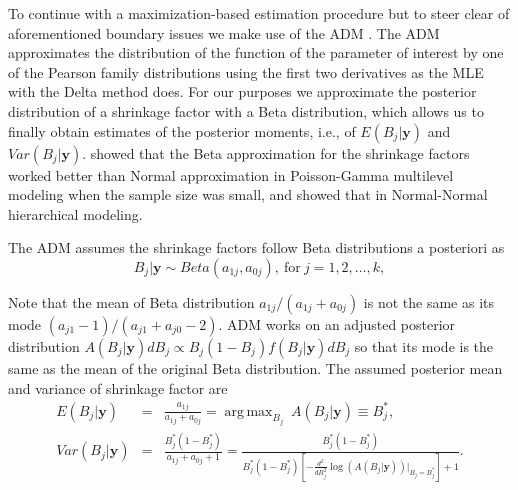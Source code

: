 \documentclass[article]{jss}
\DeclareMathOperator*{\argmax}{arg\,max}
\begin{document}
To continue with a maximization-based estimation procedure but to steer clear of aforementioned boundary issues we make use of the ADM \citep{carl1988, morris1997, tang2011}. The ADM approximates the distribution of the function of the parameter of interest by one of the Pearson family distributions using the first two derivatives as the MLE with the Delta method does. For our purposes we approximate the posterior distribution of a shrinkage factor with a Beta distribution, which allows us to finally obtain estimates of the posterior moments, i.e.,  of $E(B_{j}\vert\boldsymbol{y})$ and $Var(B_{j}\vert\boldsymbol{y})$.  \citet{morris1997} showed that the Beta approximation for the shrinkage factors worked better than Normal approximation in Poisson-Gamma multilevel modeling when the sample size was small, and \citet{tang2011} showed that  in Normal-Normal hierarchical modeling. 

The ADM assumes the shrinkage factors follow Beta distributions a posteriori as
\begin{equation}\label{admshrinkage}
B_j\vert\boldsymbol{y}\sim Beta(a_{1j}, a_{0j}), ~\textrm{for}~j=1, 2, \ldots, k,
\end{equation}


Note that the mean of Beta distribution $a_{1j}/(a_{1j}+a_{0j})$ is not the same as its mode $(a_{j1}-1)/(a_{j1}+a_{j0}-2)$. ADM works on an adjusted posterior distribution $A(B_j\vert \boldsymbol{y})dB_j\propto B_j(1-B_j)f(B_j\vert \boldsymbol{y})dB_j$ so that its mode is the same as the mean of the original Beta distribution. The assumed posterior mean and variance of shrinkage factor are
\begin{eqnarray}
E(B_j\vert\boldsymbol{y})&=&\frac{a_{1j}}{a_{1j}+a_{0j}}=\argmax_{B_j}~ A(B_j\vert \boldsymbol{y})\equiv B^\ast_j,\label{admmean}\\
Var(B_j\vert\boldsymbol{y})&=&\frac{B^\ast_j(1-B^\ast_j)}{a_{1j}+a_{0j}+1}=\frac{B^\ast_j(1-B^\ast_j)}{B^\ast_j(1-B^\ast_j)[-\frac{d^2}{dB^2_j}\log(A(B_j\vert \boldsymbol{y}))\vert_{B_j=B^\ast_j}] +1}.\label{admvar}
\end{eqnarray}
\end{document}

